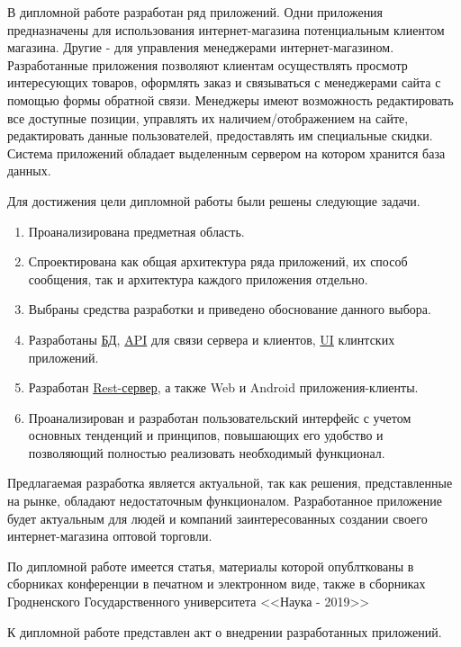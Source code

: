 \indent

В дипломной работе разработан ряд приложений.
Одни приложения предназначены для использования интернет-магазина потенциальным клиентом магазина.
Другие -  для управления менеджерами интернет-магазином.
Разработанные приложения позволяют клиентам осуществлять просмотр интересующих товаров, оформлять заказ и связываться с менеджерами сайта с помощью формы обратной связи.
Менеджеры имеют возможность редактировать все доступные позиции, управлять их наличием/отображением на сайте, редактировать данные пользователей, предоставлять им специальные скидки.
Система приложений обладает выделенным сервером на котором хранится база данных.

Для достижения цели дипломной работы были решены следующие задачи.
\begin{enumerate}
    \item Проанализирована предметная область.
    \item Спроектирована как общая архитектура ряда приложений, их способ сообщения, так и архитектура каждого приложения отдельно.
    \item Выбраны средства разработки и приведено обоснование данного выбора.
    \item Разработаны \hyperlink{gloss:db}{БД}, \hyperlink{gloss:api}{API} для связи сервера и клиентов, \hyperlink{gloss:ui}{UI} клинтских приложений.
    \item Разработан \hyperlink{gloss:rest}{Rest-сервер}, а также Web и Android приложения-клиенты.
    \item Проанализирован и разработан пользовательский интерфейс с учетом основных тенденций и принципов, повышающих его удобство и позволяющий полностью реализовать необходимый функционал.
\end{enumerate}

Предлагаемая разработка является актуальной, так как решения, представленные на рынке, обладают недостаточным функционалом.
Разработанное приложение будет актуальным для людей и компаний заинтересованных создании своего интернет-магазина оптовой торговли.

По дипломной работе имеется статья, материалы которой опублткованы в сборниках конференции в печатном и электронном виде, 
также в сборниках Гродненского Государственного университета <<Наука - 2019>>

К дипломной работе представлен акт о внедрении разработанных приложений.